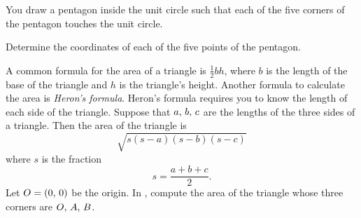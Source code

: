 \documentclass[a4paper,oneside,12pt]{article}
\begin{document}
\begin{problem}
\item You draw a pentagon inside the unit circle such that each of the
  five corners of the pentagon touches the unit circle.
  \begin{packedenum}
  \item Determine the coordinates of each of the five points of the
    pentagon.
  \end{packedenum}

\item A common formula for the area of a triangle is $\frac{1}{2} bh$,
  where $b$ is the length of the base of the triangle and $h$ is the
  triangle's height.  Another formula to calculate the area is
  \emph{Heron's formula}.  Heron's formula requires you to know the
  length of each side of the triangle.  Suppose that
  ${a},\, {b},\, {c}$ are the lengths of the three sides of a triangle.
  Then the area of the triangle is
  \[
  \sqrt{
    s (s - a) (s - b) (s - c)
  }
  \]
  where $s$ is the fraction
  \[
  s
  =
  \frac{a + b + c}{2}.
  \]
  Let $O = \left\lparen{0},\, {0}\right\rparen$ be the origin.  In
  , compute the area of the
  triangle whose three corners are ${O},\, {A},\, {B}$.
\end{problem}
\end{document}
